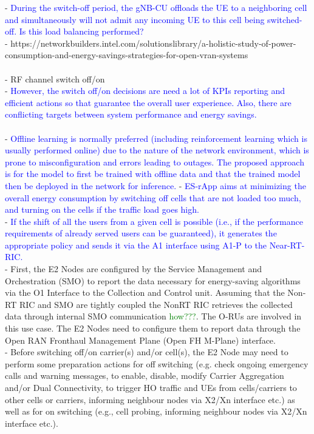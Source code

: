\documentclass[conference]{IEEEtran}
\begin{document}
- \textcolor{blue}{During the switch-off period, the gNB-CU offloads the UE to a neighboring cell and simultaneously will not admit any incoming UE to this cell being switched-off. Is this load balancing performed?}\\
- https://networkbuilders.intel.com/solutionslibrary/a-holistic-study-of-power-consumption-and-energy-savings-strategies-for-open-vran-systems \\ 
\\
- RF channel switch off/on \\
- \textcolor{blue}{However, the switch off/on decisions are need a lot of KPIs reporting and efficient actions so that guarantee the overall user experience. Also, there are conflicting targets between system performance and energy savings.} \\
\\
- \textcolor{blue}{Offline learning is normally preferred (including reinforcement learning which is usually performed online) due to the nature of the network environment, which is prone to misconfiguration and errors leading to outages. The proposed approach is for the model to first be trained with offline data and that the trained model then be deployed in the network for inference.} 
- \textcolor{blue}{ES-rApp aims at minimizing the overall energy consumption by switching off cells that are not loaded too much, and turning on the cells if the traffic load goes high.}\\
- \textcolor{blue}{If the shift of all the users from a given cell is possible (i.e., if the performance requirements of already served users can be guaranteed), it generates the appropriate policy and sends it via the A1 interface using A1-P to the Near-RT-RIC.} \\
- First, the E2 Nodes are configured by the Service Management and Orchestration (SMO) to report the data necessary for energy-saving algorithms via the O1 Interface to the Collection and Control unit. Assuming that the Non-RT RIC and SMO are tightly coupled the NonRT RIC retrieves the collected data through internal SMO communication \textcolor{green}{how???}. The O-RUs are involved in this use case. The E2 Nodes need to configure them to report data through the Open RAN Fronthaul Management Plane (Open FH M-Plane) interface.\\
- Before switching off/on carrier(s) and/or cell(s), the E2 Node may need to perform some preparation actions for off switching (e.g. check ongoing emergency calls and warning messages, to enable, disable, modify Carrier Aggregation and/or Dual Connectivity, to trigger HO traffic and UEs from cells/carriers to other cells or carriers, informing neighbour nodes via X2/Xn interface etc.) as well as for on switching (e.g., cell probing, informing neighbour nodes via X2/Xn interface etc.). \\
\end{document}
